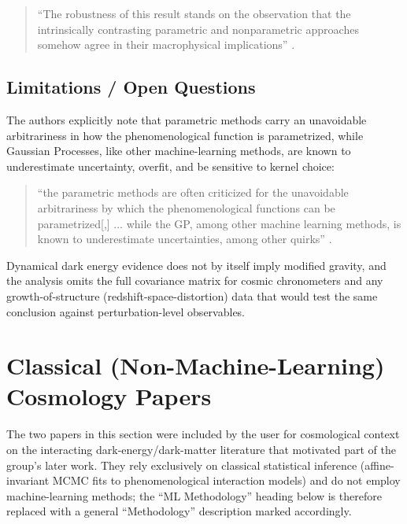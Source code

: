 \documentclass[11pt]{article}
\begin{document}
\begin{quote}
\enquote{The robustness of this result stands on the observation that the intrinsically contrasting parametric and nonparametric approaches somehow agree in their macrophysical implications} \citep[p.~16]{bernardo2022parametric}.
\end{quote}

\subsection{Limitations / Open Questions}
The authors explicitly note that parametric methods carry an unavoidable arbitrariness in how the phenomenological function is parametrized, while Gaussian Processes, like other machine-learning methods, are known to underestimate uncertainty, overfit, and be sensitive to kernel choice:

\begin{quote}
\enquote{the parametric methods are often criticized for the unavoidable arbitrariness by which the phenomenological functions can be parametrized[,] ... while the GP, among other machine learning methods, is known to underestimate uncertainties, among other quirks} \citep[p.~34]{bernardo2022parametric}.
\end{quote}

\noindent Dynamical dark energy evidence does not by itself imply modified gravity, and the analysis omits the full covariance matrix for cosmic chronometers and any growth-of-structure (redshift-space-distortion) data that would test the same conclusion against perturbation-level observables.

\section{Classical (Non-Machine-Learning) Cosmology Papers}
\label{sec:nonml}

The two papers in this section were included by the user for cosmological context on the interacting dark-energy/dark-matter literature that motivated part of the group's later work. They rely exclusively on classical statistical inference (affine-invariant MCMC fits to phenomenological interaction models) and do not employ machine-learning methods; the ``ML Methodology'' heading below is therefore replaced with a general ``Methodology'' description marked accordingly.
\end{document}
